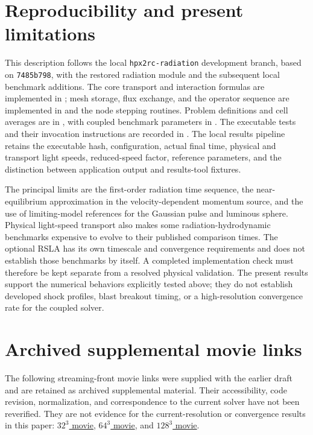 \documentclass[manuscript]{aastex7}
\newcommand{\code}[1]{\texttt{#1}}
\begin{document}
\section{Reproducibility and present limitations}
This description follows the local \code{hpx2rc-radiation} development
branch, based on \code{7485b798}, with the restored radiation module and
the subsequent local benchmark additions. The core transport and
interaction formulas are implemented in
; mesh storage, flux exchange, and the
operator sequence are implemented in
 and the node stepping routines.
Problem definitions and cell averages are in
, with coupled benchmark parameters in
. The executable tests and their invocation
instructions are recorded in . The local results
pipeline retains the executable hash, configuration, actual final time,
physical and transport light speeds, reduced-speed factor, reference
parameters, and the distinction between application output
and results-tool fixtures.

The principal limits are the first-order radiation time sequence, the
near-equilibrium approximation in the velocity-dependent momentum
source, and the use of limiting-model references for the Gaussian pulse
and luminous sphere. Physical light-speed transport also makes some
radiation-hydrodynamic benchmarks expensive to evolve to their published
comparison times. The optional RSLA has its own timescale and convergence
requirements and does not establish those benchmarks by itself.
A completed implementation check must therefore be
kept separate from a resolved physical validation. The present results
support the numerical behaviors explicitly tested above; they do not
establish developed shock profiles, blast breakout timing, or a
high-resolution convergence rate for the coupled solver.

\appendix
\section{Archived supplemental movie links}
The following streaming-front movie links were supplied with the earlier
draft and are retained as archived supplemental material. Their
accessibility, code revision, normalization, and correspondence to the
current solver have not been reverified. They are not evidence for the
current-resolution or convergence results in this paper:
\href{https://lsu.box.com/s/o5fwovq8lcowoq0zlh5wwvkmqvq7n3ny}{$32^3$ movie},
\href{https://lsu.box.com/s/3lxru1v0uazeq2tiyfiv59c9m34y2fpz}{$64^3$ movie}, and
\href{https://lsu.box.com/s/cm7pqeqgr5dlzsr1s5tof6vvy1bw2ug3}{$128^3$ movie}.
\end{document}
